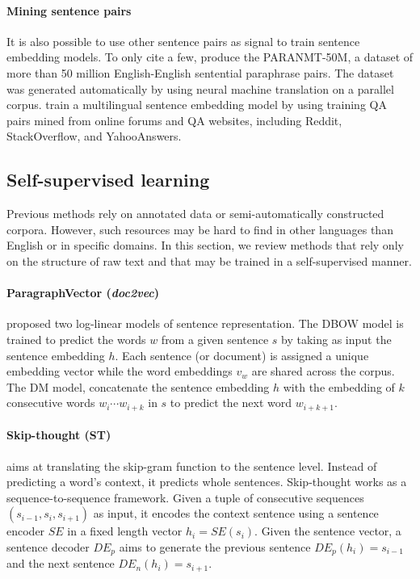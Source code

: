 \paragraph{Mining sentence pairs} 

It is also possible to use other sentence pairs as signal to train sentence embedding models. To only cite a few, \textcite{gimpel_18} produce the PARANMT-50M, a dataset of more than 50 million English-English sentential paraphrase pairs. The dataset was generated automatically by using neural machine translation on a parallel corpus. \textcite{yang_20} train a multilingual sentence embedding model by using training QA pairs mined from online forums and QA websites, including Reddit, StackOverflow, and YahooAnswers.


\subsection{Self-supervised learning}

Previous methods rely on annotated data or semi-automatically constructed corpora. However, such resources may be hard to find in other languages than English or in specific domains. In this section, we review methods that rely only on the structure of raw text and that may be trained in a self-supervised manner. 

\paragraph{ParagraphVector (\textsl{doc2vec})} \textcite{le_14} proposed two log-linear models of sentence representation. The DBOW model is trained to predict the words $w$ from a given sentence $s$ by taking as input the sentence embedding $h$. Each sentence (or document) is assigned a unique embedding vector while the word embeddings $v_w$ are shared across the corpus. The DM model, concatenate the sentence embedding $h$ with the embedding of $k$ consecutive words $w_i \cdots w_{i+k}$ in $s$ to predict the next word $w_{i+k+1}$. 

\paragraph{Skip-thought (ST)} \textcite{kiros_15} aims at translating the skip-gram function to the sentence level. Instead of predicting a word's context, it predicts whole sentences. Skip-thought works as a sequence-to-sequence framework. Given a tuple of consecutive sequences $(s_{i-1}, s_i, s_{i+1})$ as input, it encodes the context sentence using a sentence encoder $SE$ in a fixed length vector $h_i = SE(s_i)$. Given the sentence vector, a sentence decoder $DE_p$ aims to generate the previous sentence $DE_p(h_i) = s_{i-1}$ and the next sentence $DE_n(h_i) = s_{i+1}$.

